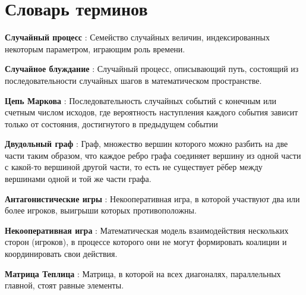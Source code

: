 \chapter*{Словарь терминов}             %

\textbf{Случайный процесс} : Семейство случайных величин, индексированных некоторым параметром, играющим роль времени.

\textbf{Случайное блуждание} : Случайный процесс, описывающий путь, состоящий из последовательности случайных шагов в математическом пространстве.

\textbf{Цепь Маркова} : Последовательность случайных событий с конечным или счетным числом исходов, где вероятность наступления каждого события зависит только от состояния, достигнутого в предыдущем событии

\textbf{Двудольный граф} : Граф, множество вершин которого можно разбить на две части таким образом, 
что каждое ребро графа соединяет вершину из одной части с какой-то вершиной другой части, то есть не существует рёбер между вершинами одной и той же части графа.

\textbf{Антагонистические игры} : Некооперативная игра, в которой участвуют два или более игроков, выигрыши которых противоположны.

\textbf{Некооперативная игра} : Математическая модель взаимодействия нескольких сторон (игроков), в процессе которого они не могут формировать коалиции и координировать свои действия.

\textbf{Матрица Теплица} : Матрица, в которой на всех диагоналях, параллельных главной, стоят равные элементы.

